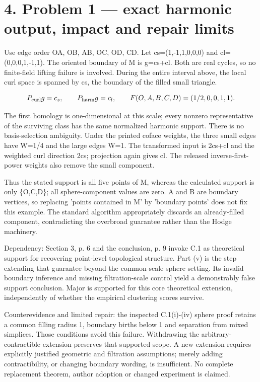 \documentclass[10pt]{article}
\begin{document}
\section*{4. Problem 1 — exact harmonic output, impact and repair limits}
Use edge order OA, OB, AB, OC, OD, CD. Let cs=(1,-1,1,0,0,0) and cl=(0,0,0,1,-1,1). The oriented boundary of M is g=cs+cl. Both are real cycles, so no finite-field lifting failure is involved. During the entire interval above, the local curl space is spanned by cs, the boundary of the filled small triangle.\par
\[P_{\rm curl}g=c_s,\qquad P_{\rm harm}g=c_l,\qquad F(O,A,B,C,D)=(1/2,0,0,1,1).\]\par
The first homology is one-dimensional at this scale; every nonzero representative of the surviving class has the same normalized harmonic support. There is no basis-selection ambiguity. Under the printed coface weights, the three small edges have W=1/4 and the large edges W=1. The transformed input is 2cs+cl and the weighted curl direction 2cs; projection again gives cl. The released inverse-first-power weights also remove the small component.\par
Thus the stated support is all five points of M, whereas the calculated support is only \{O,C,D\}; all sphere-component values are zero. A and B are boundary vertices, so replacing ’points contained in M’ by ’boundary points’ does not fix this example. The standard algorithm appropriately discards an already-filled component, contradicting the overbroad guarantee rather than the Hodge machinery.\par
Dependency: Section 3, p. 6 and the conclusion, p. 9 invoke C.1 as theoretical support for recovering point-level topological structure. Part (v) is the step extending that guarantee beyond the common-scale sphere setting. Its invalid boundary inference and missing filtration-scale control yield a demonstrably false support conclusion. Major is supported for this core theoretical extension, independently of whether the empirical clustering scores survive.\par
Counterevidence and limited repair: the inspected C.1(i)-(iv) sphere proof retains a common filling radius 1, boundary births below 1 and separation from mixed simplices. Those conditions avoid this failure. Withdrawing the arbitrary-contractible extension preserves that supported scope. A new extension requires explicitly justified geometric and filtration assumptions; merely adding contractibility, or changing boundary wording, is insufficient. No complete replacement theorem, author adoption or changed experiment is claimed.\par
\end{document}
